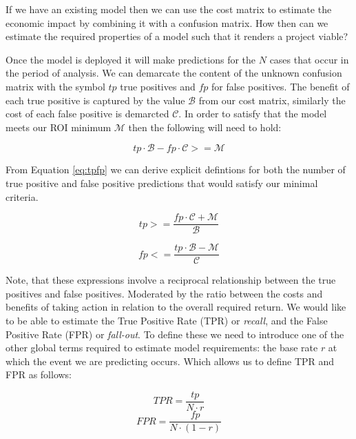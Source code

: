 \documentclass[12pt,a4paper]{article}
\numberwithin{equation}{section}
\begin{document}
If we have an existing model then we can use the cost matrix to estimate the economic
impact by combining it with a confusion matrix. How then can we estimate the required properties of
a model such that it renders a project viable?

Once the model is deployed it will make predictions for the $N$ cases that occur in the period of analysis.
We can demarcate the content of the unknown confusion matrix with
the symbol $tp$ true positives and $fp$ for false positives. 
The benefit of each true positive is captured
by the value $\mathcal{B}$ from our cost matrix, similarly the cost of each false positive is 
demarcted $\mathcal{C}$.
In order to satisfy that the model meets our ROI minimum $\mathcal{M}$ then the following
will need to hold:

\begin{equation}
\label{eq:tpfp}
tp \cdot \mathcal{B} - fp \cdot \mathcal{C} >= \mathcal{M}
\end{equation}
 
From Equation \ref{eq:tpfp} we can derive explicit defintions for both the number of true positive and false
positive predictions that would satisfy our minimal criteria.

\begin{equation}
tp >= \frac{fp \cdot \mathcal{C} + \mathcal{M}}{\mathcal{B}}
\end{equation}

\begin{equation}
fp <= \frac{tp \cdot \mathcal{B} - \mathcal{M}}{\mathcal{C}}
\end{equation}

Note, that these expressions involve a reciprocal relationship between the true positives and false positives. 
Moderated by the ratio between the costs and benefits of taking action in relation to the overall required return.
We would like to be able to estimate the True Positive Rate (TPR) or \textit{recall},
and the False Positive Rate (FPR) or \textit{fall-out}.
To define these we need to introduce one of the other global terms required to estimate
model requirements: the base rate $r$ at which the event we are predicting occurs.
Which allows us to define TPR and FPR as follows:

\begin{equation}
TPR = \frac{ tp }{ N \cdot r }
\end{equation}
\begin{equation}
FPR = \frac{ fp }{ N \cdot (1-r) }
\end{equation}
\end{document}
